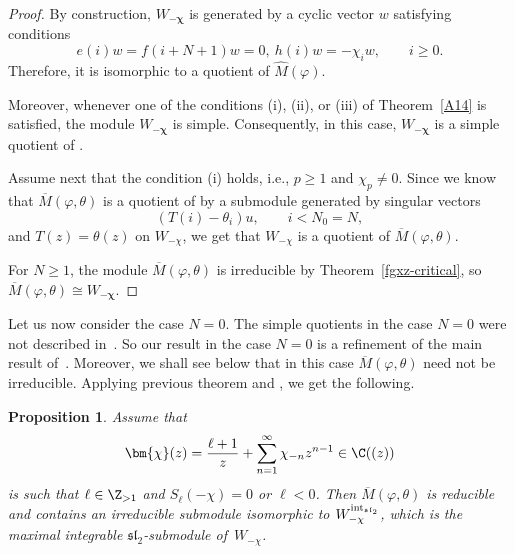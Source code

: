 \documentclass[pdftex]{sigma}
\numberwithin{equation}{section}
\newtheorem{Proposition}[Theorem]{Proposition}
\theoremstyle{definition}
\newcommand{\1}{\textbf{1}}
\begin{document}
 \begin{proof}
By construction, $W_{-\bm{\chi}}$ is generated by a cyclic vector $w$ satisfying conditions
 \[ e(i) w = f(i+ N+1) w =0, \ h(i) w = -\chi _i w, \qquad i\ge 0. \]
Therefore, it is isomorphic to a quotient of $\widehat M( \varphi)$.

Moreover, whenever one of the conditions \textnormal{(i)}, \textnormal{(ii)}, or \textnormal{(iii)} of Theorem~\ref{A14} is satisfied, the module $W_{-\boldsymbol{\chi}}$ is simple. Consequently, in this case, $W_{-\boldsymbol{\chi}}$ is a simple quotient of .

Assume next that the condition (i) holds, i.e., $p \ge 1$ and $\chi_p \ne 0$. Since we know that $\overline M(\varphi, \theta)$ is a quotient of  by a submodule generated by singular vectors
 \[ (T(i) - \theta_i) u, \qquad i < N_0 = N, \]
and $T(z) = \theta(z)$ on $W_{-\chi}$, we get that $W_{-\chi}$ is a quotient of $\overline M(\varphi, \theta)$.


For $N\ge 1$, the module $\overline M(\varphi, \theta)$ is irreducible by Theorem~\ref{fgxz-critical}, so $\overline M(\varphi, \theta) \cong W_{-\bm{\chi}}$.
 \end{proof}

Let us now consider the case $N=0$. The simple quotients in the case $N=0$ were not described in~\cite{FGXZ}. So our result in the case $N=0$ is a refinement of the main result of~\cite{FGXZ}.
Moreover, we shall see below that in this case $\overline M(\varphi, \theta)$ need not be irreducible.
 Applying previous theorem and \cite[Corollary 5.2 and Remark 5.1]{A-14}, we get the following.

\begin{Proposition} \label{reducibilni}
 Assume that \[ \bm{\chi}(z) = \frac{\ell +1}{z} + \sum_{n=1} ^{\infty} {\chi}_{-n} z ^{n-1} \in
{\C}((z))\]
is such that
 $\ell \in {\Z}_{>1} $ and $S_{\ell}(-\chi) =0 $ or $\ell <0$.
Then $\overline M(\varphi, \theta)$ is reducible and contains an irreducible submodule isomorphic to $W_{-\chi} ^{{\rm int}_{\mathfrak{sl}_2}}$, which is the maximal integrable $\mathfrak{sl}_2$-submodule of~$W_{-\chi}$.
 \end{Proposition}
\end{document}
